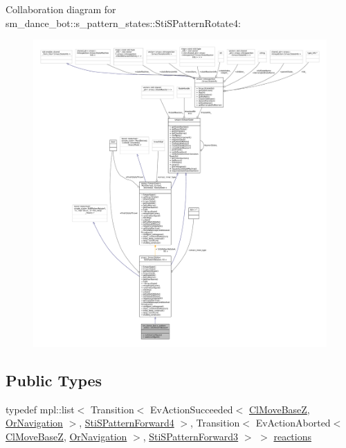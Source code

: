 Collaboration diagram for sm\+\_\+dance\+\_\+bot\+:\+:s\+\_\+pattern\+\_\+states\+:\+:Sti\+S\+Pattern\+Rotate4\+:
\nopagebreak
\begin{figure}[H]
\begin{center}
\leavevmode
\includegraphics[width=350pt]{structsm__dance__bot_1_1s__pattern__states_1_1StiSPatternRotate4__coll__graph}
\end{center}
\end{figure}
\subsection*{Public Types}
\begin{DoxyCompactItemize}
\item 
typedef mpl\+::list$<$ Transition$<$ Ev\+Action\+Succeeded$<$ \hyperlink{classcl__move__base__z_1_1ClMoveBaseZ}{Cl\+Move\+BaseZ}, \hyperlink{classsm__dance__bot_1_1OrNavigation}{Or\+Navigation} $>$, \hyperlink{structsm__dance__bot_1_1s__pattern__states_1_1StiSPatternForward4}{Sti\+S\+Pattern\+Forward4} $>$, Transition$<$ Ev\+Action\+Aborted$<$ \hyperlink{classcl__move__base__z_1_1ClMoveBaseZ}{Cl\+Move\+BaseZ}, \hyperlink{classsm__dance__bot_1_1OrNavigation}{Or\+Navigation} $>$, \hyperlink{structsm__dance__bot_1_1s__pattern__states_1_1StiSPatternForward3}{Sti\+S\+Pattern\+Forward3} $>$ $>$ \hyperlink{structsm__dance__bot_1_1s__pattern__states_1_1StiSPatternRotate4_a79688efd233c787e1328cd13a5fd0166}{reactions}
\end{DoxyCompactItemize}
